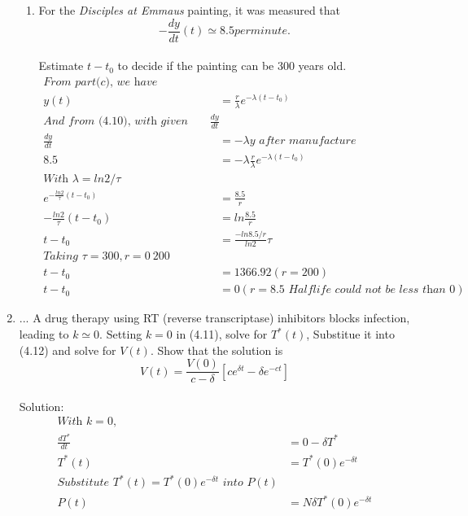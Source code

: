 \documentclass{article}
\begin{document}
\begin{enumerate}
\begin{enumerate}
		\item For the \textit{Disciples at Emmaus} painting, it was measured that
		\begin{equation*}
			-\frac{dy}{dt}(t) \simeq 8.5 per minute.
		\end{equation*}
		\\ Estimate $t - t_0$ to decide if the painting can be 300 years old.
		\begin{align*}
			\textit{From part(c), we have} \\
			y(t) &= \frac{r}{\lambda} e^{-\lambda(t - t_0)} \\
			\textit{And from (4.10), with given value of $\frac{dy}{dt}$} \\
			\frac{dy}{dt} &= -\lambda y \textit{ after manufacture} \\
			8.5 &= -\lambda \frac{r}{\lambda} e^{-\lambda(t - t_0)} \\
			\textit{With $\lambda = ln{2} / \tau$} \\
			e^{-\frac{ln{2}}{\tau}(t - t_0)} &= \frac{8.5}{r} \\
			-\frac{ln2}{\tau} (t - t_0) &= ln{\frac{8.5}{r}} \\
			t - t_0 &= \frac{-ln{8.5 / r}}{ln2}\tau \\
			\textit{Taking $\tau = 300, r = 0 ~ 200$} \\
			t - t_0 &= 1366.92 (r = 200) \\
			t - t_0 &= 0 (r = 8.5 \textit{ Halflife could not be less than 0})
		\end{align*}
	\end{enumerate}
	\item ... A drug therapy using RT (reverse transcriptase) inhibitors blocks infection, leading to $k \simeq 0$. Setting $k = 0$ in (4.11), solve for $T^{*}(t)$, Substitue it into (4.12) and solve for $V(t)$. Show that the solution is 
	\begin{equation}
		V(t) = \frac{V(0)}{c - \delta}[ce^{\delta t} - \delta e^{-ct}]
	\end{equation}
	\\ Solution:
	\begin{align*}
		\textit{With $k = 0$,} \\
		\frac{dT^{*}}{dt} &= 0 - \delta T^{*} \\
		T^{*}(t) &= T^{*}(0)e^{-\delta t} \\
		\textit{Substitute $T^{*}(t) = T^{*}(0)e^{-\delta t}$ into $P(t)$} \\
		P(t) &= N\delta T^{*}(0)e^{-\delta t} \\

\end{align*}
\end{enumerate}
\end{document}

